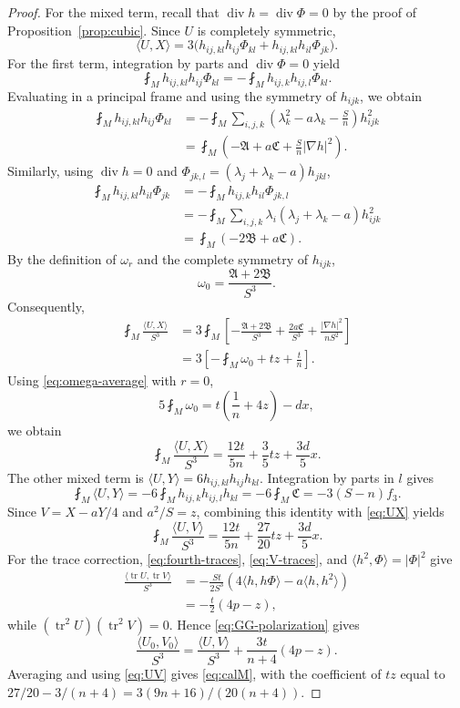 \documentclass[11pt,reqno]{amsart}
\numberwithin{equation}{section}
\newcommand{\tr}{\operatorname{tr}}
\newcommand{\diver}{\operatorname{div}}
\newcommand{\ip}[2]{\langle #1,#2\rangle}
\newcommand{\norm}[1]{\lvert #1\rvert}
\begin{document}
\begin{proof}
For the mixed term, recall that $\diver h=\diver\Phi=0$ by the proof of Proposition~\ref{prop:cubic}. Since $U$ is completely symmetric,
\[
\ip{U}{X}
=3\bigl(h_{ij,kl}h_{ij}\Phi_{kl}
+h_{ij,kl}h_{il}\Phi_{jk}\bigr).
\]
For the first term, integration by parts and $\diver\Phi=0$ yield
\[
\fint_M h_{ij,kl}h_{ij}\Phi_{kl}
=-\fint_M h_{ij,k}h_{ij,l}\Phi_{kl}.
\]
Evaluating in a principal frame and using the symmetry of $h_{ijk}$, we obtain
\begin{align*}
\fint_M h_{ij,kl}h_{ij}\Phi_{kl}
&=-\fint_M\sum_{i,j,k}
\left(\lambda_k^2-a\lambda_k-\frac Sn\right)h_{ijk}^2\\
&=\fint_M\left(-\mathfrak A+a\mathfrak C
+\frac Sn\norm{\nabla h}^2\right).
\end{align*}
Similarly, using $\diver h=0$ and
$\Phi_{jk,l}=(\lambda_j+\lambda_k-a)h_{jkl}$,
\begin{align*}
\fint_M h_{ij,kl}h_{il}\Phi_{jk}
&=-\fint_M h_{ij,k}h_{il}\Phi_{jk,l}\\
&=-\fint_M\sum_{i,j,k}
\lambda_i(\lambda_j+\lambda_k-a)h_{ijk}^2\\
&=\fint_M(-2\mathfrak B+a\mathfrak C).
\end{align*}
By the definition of $\omega_r$ and the complete symmetry of $h_{ijk}$,
\[
\omega_0=\frac{\mathfrak A+2\mathfrak B}{S^3}.
\]
Consequently,
\begin{align*}
\fint_M\frac{\ip{U}{X}}{S^3}
&=
3\fint_M
\left[
-\frac{\mathfrak A+2\mathfrak B}{S^3}
+\frac{2a\mathfrak C}{S^3}
+\frac{\norm{\nabla h}^2}{nS^2}
\right]\\
&=
3\left[
-\fint_M\omega_0
+tz+\frac tn
\right].
\end{align*}
Using \eqref{eq:omega-average} with $r=0$,
\[
5\fint_M\omega_0=t\left(\frac1n+4z\right)-dx,
\]
we obtain
\begin{equation}\label{eq:UX}
\fint_M\frac{\ip{U}{X}}{S^3}
=\frac{12t}{5n}+\frac35tz+\frac{3d}{5}x.
\end{equation}
The other mixed term is $\ip UY=6h_{ij,kl}h_{ij}h_{kl}$. Integration by parts in $l$ gives
\[
\fint_M\ip UY
=-6\fint_M h_{ij,k}h_{ij,l}h_{kl}
=-6\fint_M\mathfrak C=-3(S-n)f_3.
\]
Since $V=X-aY/4$ and $a^2/S=z$, combining this identity with \eqref{eq:UX} yields
\begin{equation}\label{eq:UV}
\fint_M\frac{\ip{U}{V}}{S^3}
=\frac{12t}{5n}+\frac{27}{20}tz+\frac{3d}{5}x.
\end{equation}
For the trace correction, \eqref{eq:fourth-traces}, \eqref{eq:V-traces}, and $\ip{h^2}{\Phi}=\norm\Phi^2$ give
\begin{align*}
\frac{\ip{\tr U}{\tr V}}{S^3}
&=-\frac{St}{2S^3}
\left(4\ip{h}{h\Phi}-a\ip{h}{h^2}\right)\\
&=-\frac t2(4p-z),
\end{align*}
while $(\tr^2U)(\tr^2V)=0$. Hence \eqref{eq:GG-polarization} gives
\[
\frac{\ip{U_0}{V_0}}{S^3}
=\frac{\ip{U}{V}}{S^3}+\frac{3t}{n+4}(4p-z).
\]
Averaging and using \eqref{eq:UV} gives \eqref{eq:calM}, with the coefficient of $tz$ equal to $27/20-3/(n+4)=3(9n+16)/(20(n+4))$.


\end{proof}
\end{document}
